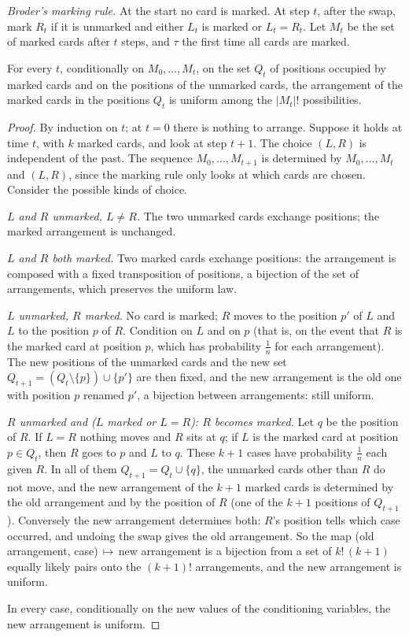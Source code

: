 \emph{Broder's marking rule.} At the start no card is marked. At step $t$, after the swap, mark $R_t$ if it is unmarked and either
$L_t$ is marked or $L_t=R_t$. Let $M_t$ be the set of marked cards after $t$ steps, and $\tau$ the first time all cards are marked.

\begin{lemma}\label{lem:broder}
For every $t$, conditionally on $M_0,\dots,M_t$, on the set $Q_t$ of positions occupied by marked cards and on the positions of the
unmarked cards, the arrangement of the marked cards in the positions $Q_t$ is uniform among the $|M_t|!$ possibilities.
\end{lemma}
\begin{proof}
By induction on $t$; at $t=0$ there is nothing to arrange. Suppose it holds at time $t$, with $k$ marked cards, and look at
step $t+1$. The choice $(L,R)$ is independent of the past. The sequence $M_0,\dots,M_{t+1}$ is determined by $M_0,\dots,M_t$ and $(L,R)$, since
the marking rule only looks at which cards are chosen. Consider the possible kinds of choice.

\emph{$L$ and $R$ unmarked, $L\ne R$.} The two unmarked cards exchange positions; the marked arrangement is unchanged.

\emph{$L$ and $R$ both marked.} Two marked cards exchange positions: the arrangement is composed with a fixed transposition of
positions, a bijection of the set of arrangements, which preserves the uniform law.

\emph{$L$ unmarked, $R$ marked.} No card is marked; $R$ moves to the position $p'$ of $L$ and $L$ to the position $p$ of $R$. Condition on $L$
and on $p$ (that is, on the event that $R$ is the marked card at position $p$, which has probability $\frac1n$ for each arrangement). The new
positions of the unmarked cards and the new set $Q_{t+1}=(Q_t\setminus\{p\})\cup\{p'\}$ are then fixed, and the new arrangement is the old one
with position $p$ renamed $p'$, a bijection between arrangements: still uniform.

\emph{$R$ unmarked and ($L$ marked or $L=R$): $R$ becomes marked.} Let $q$ be the position of $R$. If $L=R$ nothing moves and $R$ sits at $q$; if $L$ is
the marked card at position $p\in Q_t$, then $R$ goes to $p$ and $L$ to $q$. These $k+1$ cases have probability $\frac1n$ each given $R$. In all of them
$Q_{t+1}=Q_t\cup\{q\}$, the unmarked cards other than $R$ do not move, and the new arrangement of the $k+1$ marked cards is determined by the
old arrangement and by the position of $R$ (one of the $k+1$ positions of $Q_{t+1}$). Conversely the new arrangement determines both:
$R$'s position tells which case occurred, and undoing the swap gives the old arrangement. So the map (old arrangement, case)$\,\mapsto\,$new
arrangement is a bijection from a set of $k!\,(k+1)$ equally likely pairs onto the $(k+1)!$ arrangements, and the new arrangement is
uniform.

In every case, conditionally on the new values of the conditioning variables, the new arrangement is uniform.
\end{proof}

